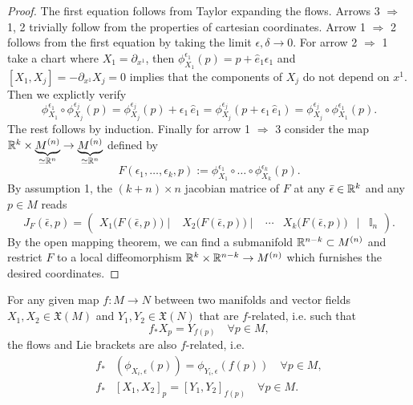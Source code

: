 \documentclass[../geometry_main.tex]{subfiles}
\begin{document}
\begin{proof}
The first equation follows from Taylor expanding the flows.
Arrows 3 $\Rightarrow$ 1, 2 trivially follow from the properties of cartesian coordinates.
Arrow 1 $\Rightarrow$ 2 follows from the first equation by taking the limit $\epsilon, \delta \to 0$.
For arrow 2 $\Rightarrow$ 1 take a chart where $X_1 = \partial_{x^1}$, then $\phi_{X_1}^{\epsilon_1}(p)=p+\hat{e}_1\epsilon_1$ and $[X_1,X_j]=-\partial_{x^1} X_j =0$ implies that the components of $X_j$ do not depend on $x^1$.
Then we explictly verify 
\begin{equation}
    \phi_{X_1}^{\epsilon_1}\circ \phi_{X_j}^{\epsilon_j}(p) = \phi_{X_j}^{\epsilon_j}(p) + \epsilon_1\, \hat{e}_1= \phi_{X_j}^{\epsilon_j}(p+ \epsilon_1\, \hat{e}_1) = \phi_{X_j}^{\epsilon_j}\circ \phi_{X_1}^{\epsilon_1}(p).
\end{equation}
The rest follows by induction.
Finally for arrow 1 $\Rightarrow$ 3 consider the map $ \mathbb{R}^k\times \underbrace{M^{(n)}}_{\simeq \mathbb{R}^n} \to\underbrace{M^{(n)}}_{\simeq \mathbb{R}^n}$ defined by
\begin{equation}
    F(\epsilon_1, \dots, \epsilon_k, p) := \phi_{X_1}^{\epsilon_1}\circ\dots\circ \phi_{X_k}^{\epsilon_k} (p).
\end{equation}
By assumption 1, the $(k+n)\times n$ jacobian matrice of $F$ at any $\bar{\epsilon}\in \mathbb{R}^k$ and any $p\in M$ reads
\begin{equation}
    J_{F}(\bar{\epsilon}, p) = \begin{pmatrix}
    X_1\big(F(\bar{\epsilon},p)\big) \mid & X_2\big(F(\bar{\epsilon},p)\big)\mid & \cdots & X_k\big(F(\bar{\epsilon},p)\big) & \mid &\mathbb{I}_n
    \end{pmatrix}.
\end{equation}
By the open mapping theorem, we can find a submanifold $\mathbb{R}^{n-k}\subset M^{(n)}$ and restrict $F$ to a local diffeomorphism $\mathbb{R}^k\times \mathbb{R}^{n-k} \to M^{(n)}$ which furnishes the desired coordinates.
%
\end{proof}


\begin{mytheorem}
%
For any given map $f:M\to N$ between two manifolds and vector fields $X_1,X_2\in \mathfrak{X}(M)$ and $Y_1,Y_2 \in \mathfrak{X}(N)$ that are $f$-related, i.e. such that
\begin{equation}
    f_* X_p = Y_{f(p)} \quad \forall p\in M,
\end{equation}
the flows and Lie brackets are also $f$-related, i.e.
\begin{align}
    f_* &(\phi_{X_i,\epsilon} (p)) = \phi_{Y_i,\epsilon} (f(p)) \quad \forall p\in M,
    \\[6pt]
    f_*& [X_1, X_2]_p = [Y_1, Y_2]_{f(p)} \quad \forall p\in M.
\end{align}
\end{mytheorem}
\end{document}
